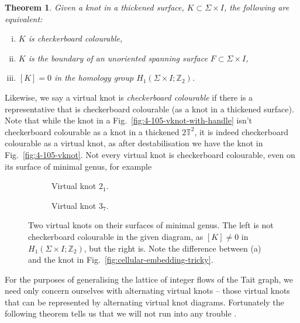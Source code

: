 \documentclass[12pt]{report}
\newcommand{\Z}{\mathbb{Z}}
\newcommand{\T}{\mathbb{T}}
\newtheorem*{theorem}{Theorem}
\begin{document}
\begin{theorem}
Given a knot in a thickened surface, $K \subset \Sigma \times I$, the following are equivalent:
	\begin{enumerate}[(i)]
	\item $K$ is checkerboard colourable,
	\item $K$ is the boundary of an unoriented spanning surface $F \subset \Sigma \times I$,
	\item $[K] = 0$ in the homology group $H_{1}(\Sigma \times I; \Z_{2})$.
	\end{enumerate} 
\end{theorem}

Likewise, we say a virtual knot is \textit{checkerboard colourable} if there is a representative that is checkerboard colourable (as a knot in a thickened surface). Note that while the knot in a Fig.~\ref{fig:4-105-vknot-with-handle} isn't checkerboard colourable as a knot in a thickened $2\T^{2}$, it is indeed checkerboard colourable as a virtual knot, as after destabilisation we have the knot in Fig.~\ref{fig:4-105-vknot}. Not every virtual knot is checkerboard colourable, even on its surface of minimal genus, for example 

\begin{figure}[hbt!]
	\hspace*{\fill}
	\begin{subfigure}[b]{0.45 \textwidth}
		\centering
		\def\svgscale{0.35}
		
		\caption{Virtual knot $2_{1}$.}
		\label{fig:non-cc-vknot}
	\end{subfigure}
	\hspace*{\fill}
	\begin{subfigure}[b]{0.45 \textwidth}
		\centering
		\def\svgscale{0.35}
		
		\caption{Virtual knot $3_{7}$.}
		\label{fig:cc-vknot}
	\end{subfigure}
	\hspace*{\fill}
	\caption{Two virtual knots on their surfaces of minimal genus. The left is not checkerboard colourable in the given diagram, as $[K] \neq 0$ in $H_{1}(\Sigma \times I; \Z_{2})$, but the right is. Note the difference between (a) and the knot in Fig.~\ref{fig:cellular-embedding-tricky}.}
	\label{fig:cc-of-vknots}
\end{figure}

For the purposes of generalising the lattice of integer flows of the Tait graph, we need only concern ourselves with alternating virtual knots -- those virtual knots that can be represented by alternating virtual knot diagrams. Fortunately the following theorem tells us that we will not run into any trouble \cite{jones-polynomial-checkerboard-colourable}.
\end{document}
